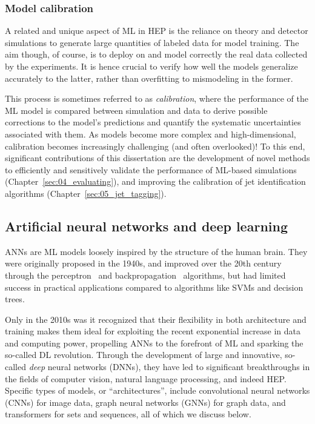 \subsubsection{Model calibration}

A related and unique aspect of ML in HEP is the reliance on theory and detector simulations to generate large quantities of labeled data for model training.
The aim though, of course, is to deploy on and model correctly the real data collected by the experiments.
It is hence crucial to verify how well the models generalize accurately to the latter, rather than overfitting to mismodeling in the former.

This process is sometimes referred to as \textit{calibration}, where the performance of the ML model is compared between simulation and data to derive possible corrections to the model's predictions and quantify the systematic uncertainties associated with them.
As models become more complex and high-dimensional, calibration becomes increasingly challenging (and often overlooked)!
To this end, significant contributions of this dissertation are the development of novel methods to efficiently and sensitively validate the performance of ML-based simulations (Chapter~\ref{sec:04_evaluating}), and improving the calibration of \HVV jet identification algorithms (Chapter~\ref{sec:05_jet_tagging}).


\subsection{Artificial neural networks and deep learning}

ANNs are ML models loosely inspired by the structure of the human brain.
They were originally proposed in the 1940s, and improved over the 20th century through the perceptron~\cite{rosenblatt1958perceptron} and backpropagation~\cite{rumelhart1986learning} algorithms, but had limited success in practical applications compared to algorithms like SVMs and decision trees.

Only in the 2010s was it recognized that their flexibility in both architecture and training makes them ideal for exploiting the recent exponential increase in data and computing power, propelling ANNs to the forefront of ML and sparking the so-called DL revolution.
Through the development of large and innovative, so-called \textit{deep} neural networks (DNNs), they have led to significant breakthroughs in the fields of computer vision, natural language processing, and indeed HEP.
Specific types of models, or ``architectures'', include convolutional neural networks (CNNs) for image data, graph neural networks (GNNs) for graph data, and transformers for sets and sequences, all of which we discuss below.

